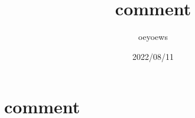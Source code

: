 \documentclass[UTF8]{article}
\title{comment}
\author{oeyoews}
\date{2022/08/11}
\begin{document}
\maketitle

\begin{comment}
 demo 
\end{comment}

\section{comment} 
\end{document}

